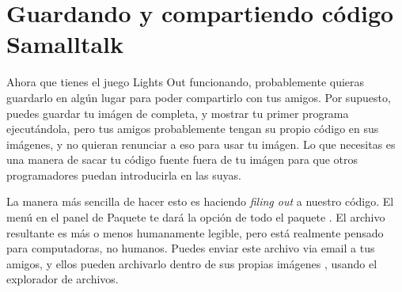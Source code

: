 \documentclass[a4paper,10pt,twoside]{book}
\begin{document}
\section{Guardando y compartiendo c\'odigo Samalltalk}

Ahora que tienes el juego Lights Out funcionando, probablemente quieras guardarlo en alg\'un lugar para poder compartirlo con tus amigos. Por supuesto, puedes guardar tu im\'agen de \pharo completa, y mostrar tu primer programa ejecut\'andola, pero tus amigos probablemente tengan su propio c\'odigo en sus im\'agenes, y no quieran renunciar a eso para usar tu im\'agen. 
Lo que necesitas es una manera de sacar tu c\'odigo fuente fuera de tu im\'agen \pharo para que otros programadores puedan introducirla en las suyas. 

La manera m\'as sencilla de hacer esto es haciendo \emph{filing out} a nuestro c\'odigo. El men\'u \actclick en el panel de Paquete te dar\'a la opci\'on  de todo el paquete .
El archivo resultante es m\'as o menos humanamente legible, pero est\'a realmente pensado para computadoras, no humanos. 
Puedes enviar este archivo via email a tus amigos, y ellos pueden archivarlo dentro de sus propias im\'agenes \pharo, usando el explorador de archivos.
\end{document}
